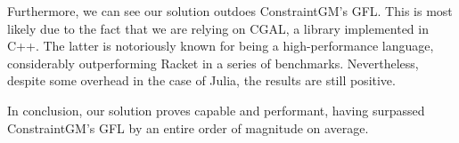 Furthermore, we can see our solution outdoes ConstraintGM's \ac{GFL}.  This is
most likely due to the fact that we are relying on \ac{CGAL}, a library
implemented in C++.  The latter is notoriously known for being a
high-performance language, considerably outperforming Racket in a series of
benchmarks.  Nevertheless, despite some overhead in the case of Julia, the
results are still positive.

In conclusion, our solution proves capable and performant, having surpassed
ConstraintGM's \ac{GFL} by an entire order of magnitude on average.
